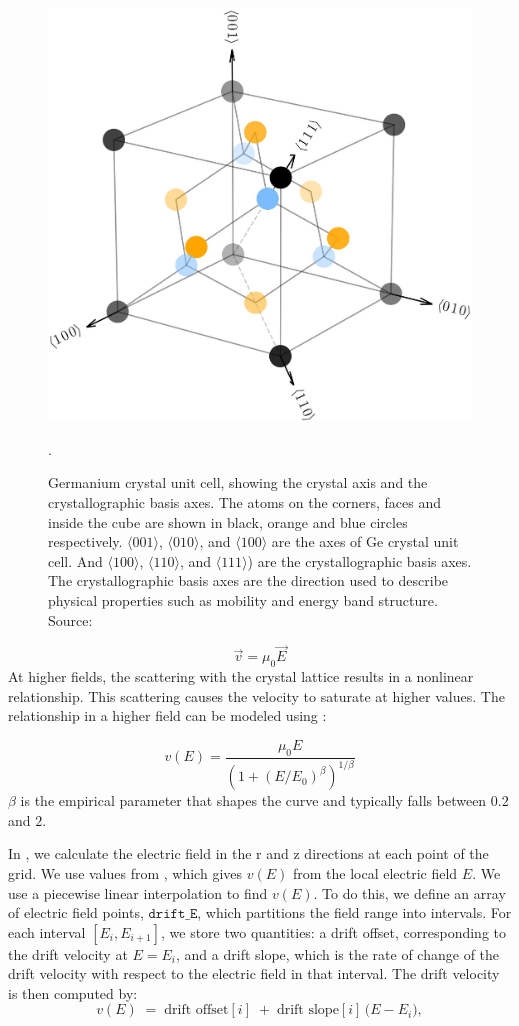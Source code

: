 \begin{figure}[!htb]
\centering
    \includegraphics[trim={0cm 0 0cm 0},clip,width=0.6\linewidth]{ch3/figs/ge_crystal_axes.jpg}
    \caption{Germanium crystal unit cell, showing the crystal axis and the crystallographic basis axes. The atoms on the corners, faces and inside the cube are shown in black, orange and blue circles respectively. $\langle 001\rangle$, $\langle 010\rangle$, and $\langle 100\rangle$ are the axes of Ge crystal unit cell. And $\langle 100\rangle$, $\langle 110\rangle$, and $\langle 111\rangle$) are the crystallographic basis axes. The crystallographic basis axes are the direction used to describe physical properties such as mobility and energy band structure. Source: \cite{HervasAguilar2023, Kittel2005}}.
    \label{ch3_figs_ge_crystal_axes}
\end{figure}


\begin{equation}
\vec{v} = \mu_0 \vec{E}
\end{equation}
At higher fields, the scattering with the crystal lattice results in a nonlinear relationship. This scattering causes the velocity to saturate at higher values. The relationship in a higher field can be modeled using \cite{Caughey_1448053}:

\begin{equation}
v(E) = \frac{\mu_0 E}{(1 + (E/E_0)^\beta)^{1/\beta}}
\end{equation}
$\beta$ is the empirical parameter that shapes the curve and typically falls between $0.2$ and $2$.

In {\ehd}, we calculate the electric field in the r and z directions at each point of the grid. We use values from \cite{OMAR19871351}, which gives $v(E)$ from the local electric field $E$. We use a piecewise linear interpolation to find $v(E)$. To do this, we define an array of electric field points, $\texttt{drift\_E}$, which partitions the field range into intervals. For each interval $[E_i, E_{i+1}]$, we store two quantities: a drift offset, corresponding to the drift velocity at $E = E_i$, and a drift slope, which is the rate of change of the drift velocity with respect to the electric field in that interval. The drift velocity is then
computed by:
\begin{equation}
  v(E) \;=\; \text{drift offset}[i]
\;+\; \text{drift slope}[i] \,\bigl( E - E_i \bigr),  
\end{equation}

